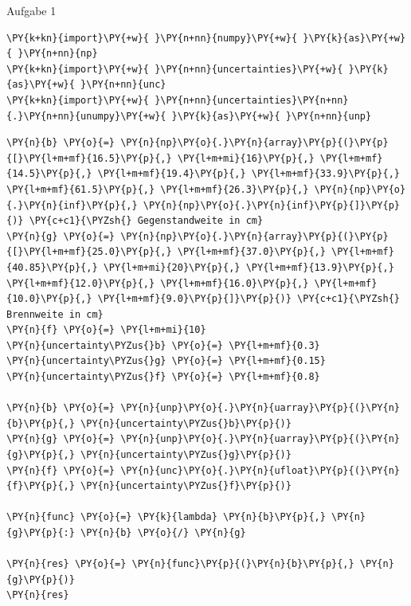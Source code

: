 
    
    Aufgabe 1

    \begin{tcolorbox}[breakable, size=fbox, boxrule=1pt, pad at break*=1mm,colback=cellbackground, colframe=cellborder]
\begin{Verbatim}[commandchars=\\\{\}]
\PY{k+kn}{import}\PY{+w}{ }\PY{n+nn}{numpy}\PY{+w}{ }\PY{k}{as}\PY{+w}{ }\PY{n+nn}{np}
\PY{k+kn}{import}\PY{+w}{ }\PY{n+nn}{uncertainties}\PY{+w}{ }\PY{k}{as}\PY{+w}{ }\PY{n+nn}{unc}
\PY{k+kn}{import}\PY{+w}{ }\PY{n+nn}{uncertainties}\PY{n+nn}{.}\PY{n+nn}{unumpy}\PY{+w}{ }\PY{k}{as}\PY{+w}{ }\PY{n+nn}{unp}
\end{Verbatim}
\end{tcolorbox}

    \begin{tcolorbox}[breakable, size=fbox, boxrule=1pt, pad at break*=1mm,colback=cellbackground, colframe=cellborder]
\begin{Verbatim}[commandchars=\\\{\}]
\PY{n}{b} \PY{o}{=} \PY{n}{np}\PY{o}{.}\PY{n}{array}\PY{p}{(}\PY{p}{[}\PY{l+m+mf}{16.5}\PY{p}{,} \PY{l+m+mi}{16}\PY{p}{,} \PY{l+m+mf}{14.5}\PY{p}{,} \PY{l+m+mf}{19.4}\PY{p}{,} \PY{l+m+mf}{33.9}\PY{p}{,} \PY{l+m+mf}{61.5}\PY{p}{,} \PY{l+m+mf}{26.3}\PY{p}{,} \PY{n}{np}\PY{o}{.}\PY{n}{inf}\PY{p}{,} \PY{n}{np}\PY{o}{.}\PY{n}{inf}\PY{p}{]}\PY{p}{)} \PY{c+c1}{\PYZsh{} Gegenstandweite in cm}
\PY{n}{g} \PY{o}{=} \PY{n}{np}\PY{o}{.}\PY{n}{array}\PY{p}{(}\PY{p}{[}\PY{l+m+mf}{25.0}\PY{p}{,} \PY{l+m+mf}{37.0}\PY{p}{,} \PY{l+m+mf}{40.85}\PY{p}{,} \PY{l+m+mi}{20}\PY{p}{,} \PY{l+m+mf}{13.9}\PY{p}{,} \PY{l+m+mf}{12.0}\PY{p}{,} \PY{l+m+mf}{16.0}\PY{p}{,} \PY{l+m+mf}{10.0}\PY{p}{,} \PY{l+m+mf}{9.0}\PY{p}{]}\PY{p}{)} \PY{c+c1}{\PYZsh{} Brennweite in cm}
\PY{n}{f} \PY{o}{=} \PY{l+m+mi}{10}
\PY{n}{uncertainty\PYZus{}b} \PY{o}{=} \PY{l+m+mf}{0.3}
\PY{n}{uncertainty\PYZus{}g} \PY{o}{=} \PY{l+m+mf}{0.15}
\PY{n}{uncertainty\PYZus{}f} \PY{o}{=} \PY{l+m+mf}{0.8}

\PY{n}{b} \PY{o}{=} \PY{n}{unp}\PY{o}{.}\PY{n}{uarray}\PY{p}{(}\PY{n}{b}\PY{p}{,} \PY{n}{uncertainty\PYZus{}b}\PY{p}{)}
\PY{n}{g} \PY{o}{=} \PY{n}{unp}\PY{o}{.}\PY{n}{uarray}\PY{p}{(}\PY{n}{g}\PY{p}{,} \PY{n}{uncertainty\PYZus{}g}\PY{p}{)}
\PY{n}{f} \PY{o}{=} \PY{n}{unc}\PY{o}{.}\PY{n}{ufloat}\PY{p}{(}\PY{n}{f}\PY{p}{,} \PY{n}{uncertainty\PYZus{}f}\PY{p}{)}

\PY{n}{func} \PY{o}{=} \PY{k}{lambda} \PY{n}{b}\PY{p}{,} \PY{n}{g}\PY{p}{:} \PY{n}{b} \PY{o}{/} \PY{n}{g}

\PY{n}{res} \PY{o}{=} \PY{n}{func}\PY{p}{(}\PY{n}{b}\PY{p}{,} \PY{n}{g}\PY{p}{)}
\PY{n}{res}
\end{Verbatim}
\end{tcolorbox}

